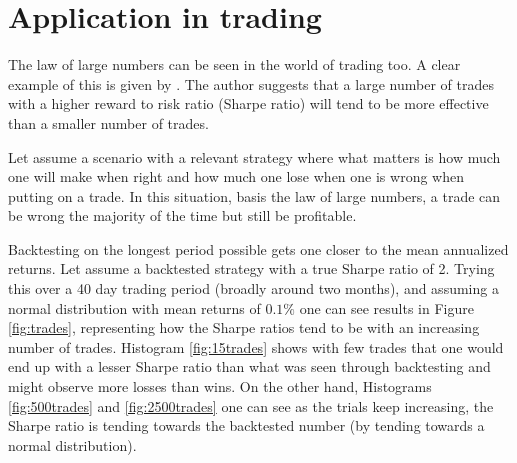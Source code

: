 \documentclass[10pt,leter,openany]{article}
\begin{document}
\section{Application in trading}

The law of large numbers can be seen in the world of trading too. A clear example of this is given by \citet{bsl2020}. The author suggests that a large number of trades with a higher reward to risk ratio (Sharpe ratio) will tend to be more effective than a smaller number of trades.

Let assume a scenario with a relevant strategy where what matters is how much one will make when right and how much one lose when one is wrong when putting on a trade. In this situation, basis the law of large numbers, a trade can be wrong the majority of the time but still be profitable.

Backtesting on the longest period possible gets one closer to the mean annualized returns. Let assume a backtested strategy with a true Sharpe ratio of 2. Trying this over a 40 day trading period (broadly around two months), and assuming a normal distribution with mean returns of $0.1\%$ one can see results in Figure \ref{fig:trades}, representing how the Sharpe ratios tend to be with an increasing number of trades. Histogram \ref{fig:15trades} shows with few trades that one would end up with a lesser Sharpe ratio than what was seen through backtesting and might observe more losses than wins. On the other hand, Histograms \ref{fig:500trades} and \ref{fig:2500trades} one can see as the trials keep increasing, the Sharpe ratio is tending towards the backtested number (by tending towards a normal distribution).
\end{document}

